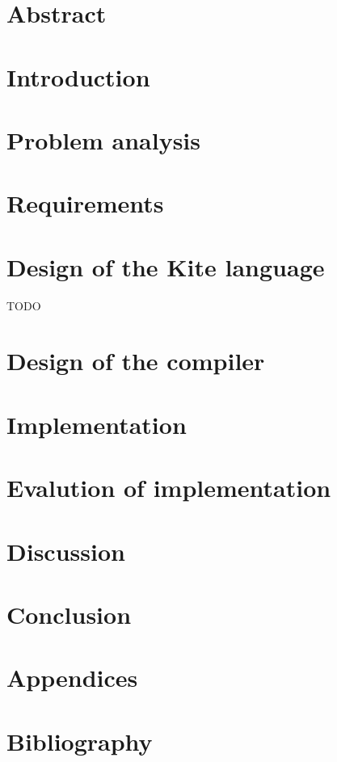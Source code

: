 \documentclass{article}
\begin{document}

\clearpage

\section*{Abstract}

\clearpage

\tableofcontents
\clearpage

\section{Introduction}

\clearpage

\section{Problem analysis}

\clearpage

\section{Requirements}

\clearpage

\section{Design of the Kite language}
TODO
\clearpage


\section{Design of the compiler}

\clearpage

\section{Implementation}

\clearpage

\section{Evalution of implementation}

\clearpage

\section{Discussion}

\clearpage

\section{Conclusion}

\clearpage

\section{Appendices}

\clearpage

\section{Bibliography}

\end{document}
